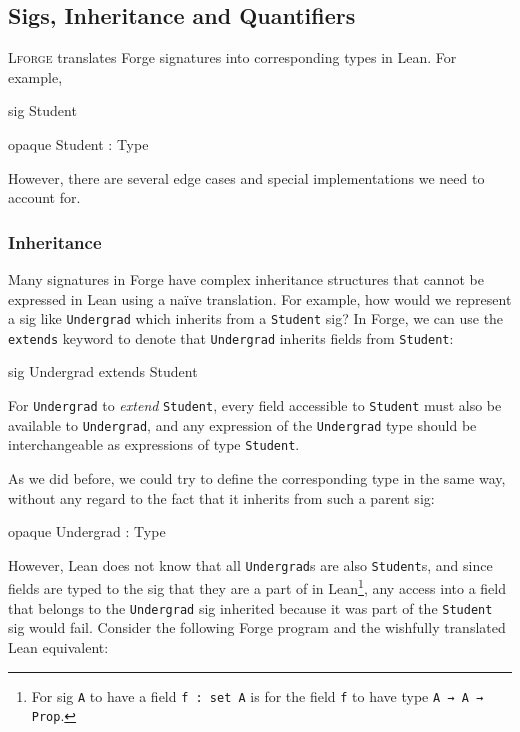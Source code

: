 \vspace*{\fill}
\newpage

\subsection{Sigs, Inheritance and Quantifiers}\label{sec:sigs}
\textsc{Lforge} translates Forge signatures into corresponding types in Lean. For example, 

\vspace{0.5em}
\noindent\begin{minipage}{0.5\textwidth}
\begin{forge*}sig Student {}\end{forge*}
\end{minipage}%
\begin{minipage}{0.5\textwidth}
\begin{lean*}opaque Student : Type\end{lean*}
\end{minipage}
\vspace{0.5em}

\noindent However, there are several edge cases and special implementations we need to account for. 

\subsubsection{Inheritance}
Many signatures in Forge have complex inheritance structures \cite{jackson2012software} that cannot be expressed in Lean using a na\"ive translation. For example, how would we represent a sig like \texttt{Undergrad} which inherits from a \texttt{Student} sig? In Forge, we can use the \texttt{extends} keyword to denote that \texttt{Undergrad} inherits fields from \texttt{Student}: 
\begin{forge*}
sig Undergrad extends Student {}
\end{forge*}

For \texttt{Undergrad} to \emph{extend} \texttt{Student}, every field accessible to \texttt{Student} must also be available to \texttt{Undergrad}, and any expression of the \texttt{Undergrad} type should be interchangeable as expressions of type \texttt{Student}. 

As we did before, we could try to define the corresponding type in the same way, without any regard to the fact that it inherits from such a parent sig: 
\begin{lean*}
opaque Undergrad : Type
\end{lean*}
However, Lean does not know that all \texttt{Undergrad}s are also \texttt{Student}s, and since fields are typed to the sig that they are a part of in Lean\footnote{For sig \texttt{A} to have a field \texttt{f : set A} is for the field \texttt{f} to have type \texttt{A → A → Prop}.}, any access into a field that belongs to the \texttt{Undergrad} sig inherited because it was part of the \texttt{Student} sig would fail. Consider the following Forge program and the wishfully translated Lean equivalent:

